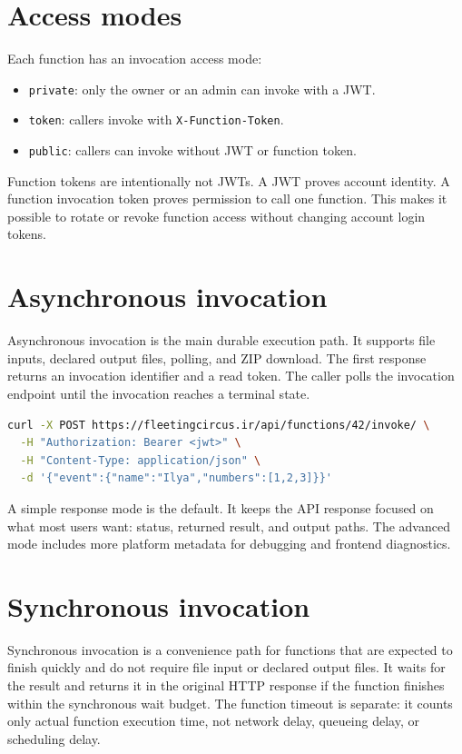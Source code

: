 \documentclass[12pt,a4paper]{report}
\newcommand{\api}[1]{\texttt{#1}}
\newcommand{\state}[1]{\texttt{#1}}
\begin{document}
\section{Access modes}

Each function has an invocation access mode:

\begin{itemize}[leftmargin=1.2cm]
  \item \state{private}: only the owner or an admin can invoke with a JWT.
  \item \state{token}: callers invoke with \api{X-Function-Token}.
  \item \state{public}: callers can invoke without JWT or function token.
\end{itemize}

Function tokens are intentionally not JWTs. A JWT proves account identity. A
function invocation token proves permission to call one function. This makes it
possible to rotate or revoke function access without changing account login
tokens.

\section{Asynchronous invocation}

Asynchronous invocation is the main durable execution path. It supports file
inputs, declared output files, polling, and ZIP download. The first response
returns an invocation identifier and a read token. The caller polls the
invocation endpoint until the invocation reaches a terminal state.

\begin{lstlisting}[language=bash,caption={Asynchronous invocation example.}]
curl -X POST https://fleetingcircus.ir/api/functions/42/invoke/ \
  -H "Authorization: Bearer <jwt>" \
  -H "Content-Type: application/json" \
  -d '{"event":{"name":"Ilya","numbers":[1,2,3]}}'
\end{lstlisting}

A simple response mode is the default. It keeps the API response focused on
what most users want: status, returned result, and output paths. The advanced
mode includes more platform metadata for debugging and frontend diagnostics.

\section{Synchronous invocation}

Synchronous invocation is a convenience path for functions that are expected to
finish quickly and do not require file input or declared output files. It waits
for the result and returns it in the original HTTP response if the function
finishes within the synchronous wait budget. The function timeout is separate:
it counts only actual function execution time, not network delay, queueing
delay, or scheduling delay.
\end{document}
